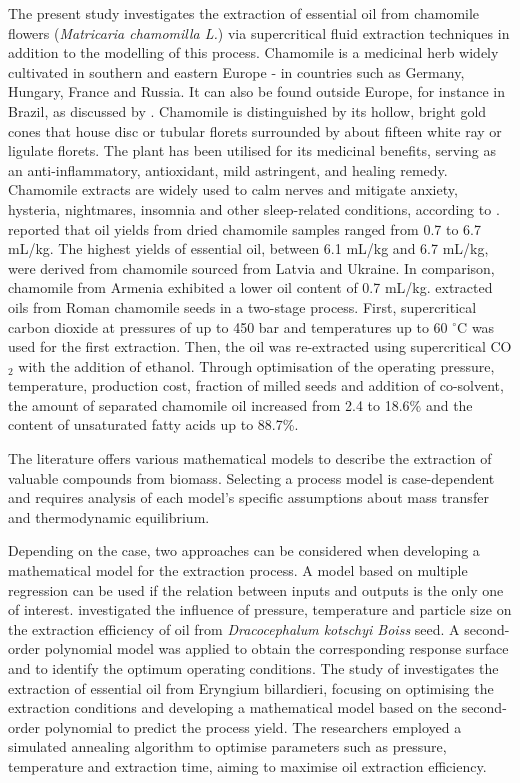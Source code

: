 \documentclass[a4paper,fleqn]{cas-dc}
\begin{document}
The present study investigates the extraction of essential oil from chamomile flowers (\textit{Matricaria chamomilla L.}) via supercritical fluid extraction techniques in addition to the modelling of this process. Chamomile is a medicinal herb widely cultivated in southern and eastern Europe - in countries such as Germany, Hungary, France and Russia. It can also be found outside Europe, for instance in Brazil, as discussed by \citet{Singh2011}. Chamomile is distinguished by its hollow, bright gold cones that house disc or tubular florets surrounded by about fifteen white ray or ligulate florets. The plant has been utilised for its medicinal benefits, serving as an anti-inflammatory, antioxidant, mild astringent, and healing remedy. Chamomile extracts are widely used to calm nerves and mitigate anxiety, hysteria, nightmares, insomnia and other sleep-related conditions, according to \citet{Srivastava2009}. \citet{Orav2010} reported that oil yields from dried chamomile samples ranged from 0.7 to 6.7 mL/kg. The highest yields of essential oil, between 6.1 mL/kg and 6.7 mL/kg, were derived from chamomile sourced from Latvia and Ukraine. In comparison, chamomile from Armenia exhibited a lower oil content of 0.7 mL/kg. \citet{Milovanovic2023} extracted oils from Roman chamomile seeds in a two-stage process. First, supercritical carbon dioxide at pressures of up to 450 bar and temperatures up to 60 $^\circ$C was used for the first extraction. Then, the oil was re-extracted using supercritical CO$_2$ with the addition of ethanol. Through optimisation of the operating pressure, temperature, production cost, fraction of milled seeds and addition of co-solvent, the amount of separated chamomile oil increased from 2.4 to 18.6\% and the content of unsaturated fatty acids up to 88.7\%.

The literature offers various mathematical models to describe the extraction of valuable compounds from biomass. Selecting a process model is case-dependent and requires analysis of each model's specific assumptions about mass transfer and thermodynamic equilibrium.

Depending on the case, two approaches can be considered when developing a mathematical model for the extraction process. A model based on multiple regression can be used if the relation between inputs and outputs is the only one of interest. \citet{Sodeifian2017a} investigated the influence of pressure, temperature and particle size on the extraction efficiency of oil from \textit{Dracocephalum kotschyi Boiss} seed. A second-order polynomial model was applied to obtain the corresponding response surface and to identify the optimum operating conditions. The study of \citet{Sodeifian2017b} investigates the extraction of essential oil from Eryngium billardieri, focusing on optimising the extraction conditions and developing a mathematical model based on the second-order polynomial to predict the process yield. The researchers employed a simulated annealing algorithm to optimise parameters such as pressure, temperature and extraction time, aiming to maximise oil extraction efficiency.
\end{document}
